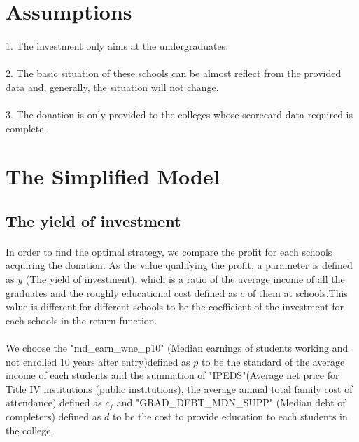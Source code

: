 \documentclass[11pt]{article}
\begin{document}
\section{Assumptions}
\paragraph{} 1. The investment only aims at the undergraduates.
\paragraph{} 2. The basic situation of these schools can be almost reflect from the provided data and, generally, the situation will not change.
\paragraph{} 3. The donation is only provided to the colleges whose scorecard data required is complete. 

\section{The Simplified Model}
\subsection{The yield of investment}  
\paragraph{} In order to find the optimal strategy, we compare the profit for each schools acquiring the donation. As the value qualifying the profit, a parameter is defined as $y$ (The yield of investment), which is a ratio of the average income of all the graduates and the roughly educational cost defined as $c$ of them at schools.This value is different for different schools to be the coefficient of the investment for each schools in the return function.
\paragraph{} We choose the "md\_earn\_wne\_p10" (Median earnings of students working and not enrolled 10 years after entry)defined as $p$ to be the standard of the average income of each students and the summation of "IPEDS"(Average net price for Title IV institutions (public institutions), the average annual total family cost of attendance) defined as $c_f$ and "GRAD\_DEBT\_MDN\_SUPP" (Median debt of completers) defined as $d$ to be the cost to provide education to each students in the college.
\end{document}
